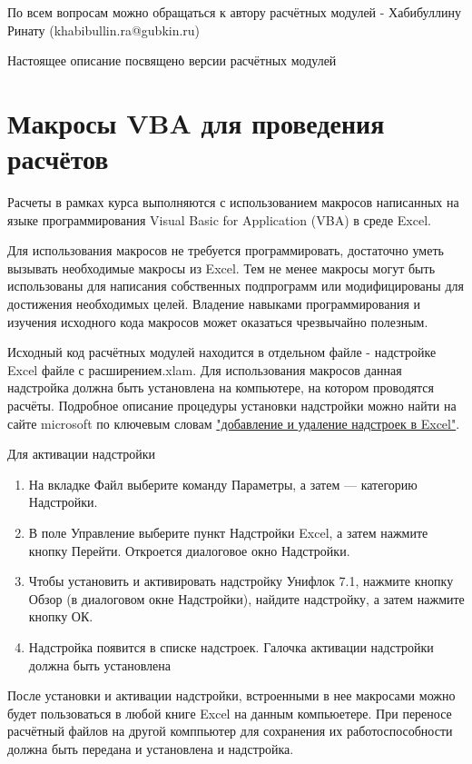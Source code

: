 \documentclass[]{scrreprt}
\begin{document}
По всем вопросам можно обращаться к автору расчётных модулей - Хабибуллину Ринату (khabibullin.ra@gubkin.ru)  

Настоящее описание посвящено версии \unf  расчётных модулей 

\chapter{Макросы VBA для проведения расчётов}

Расчеты в рамках курса выполняются с использованием макросов написанных на языке программирования Visual Basic for Application (VBA) в среде Excel.

Для использования макросов не требуется программировать, достаточно уметь вызывать необходимые макросы из Excel. Тем не менее макросы могут быть использованы для написания собственных подпрограмм или модифицированы для достижения необходимых целей. Владение навыками программирования и изучения исходного кода макросов может оказаться чрезвычайно полезным. 

Исходный код расчётных модулей находится в отдельном файле - надстройке Excel файле с расширением.xlam. Для использования макросов данная надстройка должна быть установлена на компьютере, на котором проводятся расчёты. Подробное описание процедуры установки надстройки можно найти на сайте microsoft по ключевым словам \href{https://support.office.com/ru-ru/article/%D0%94%D0%BE%D0%B1%D0%B0%D0%B2%D0%BB%D0%B5%D0%BD%D0%B8%D0%B5-%D0%B8-%D1%83%D0%B4%D0%B0%D0%BB%D0%B5%D0%BD%D0%B8%D0%B5-%D0%BD%D0%B0%D0%B4%D1%81%D1%82%D1%80%D0%BE%D0%B5%D0%BA-%D0%B2-excel-0af570c4-5cf3-4fa9-9b88-403625a0b460}{"добавление и удаление надстроек в Excel"}.

Для активации надстройки 
\begin{enumerate}
	\item На вкладке Файл выберите команду Параметры, а затем — категорию Надстройки.
	\item В поле Управление выберите пункт Надстройки Excel, а затем нажмите кнопку Перейти. Откроется диалоговое окно Надстройки.
	\item Чтобы установить и активировать надстройку Унифлок 7.1, нажмите кнопку Обзор (в диалоговом окне Надстройки), найдите надстройку, а затем нажмите кнопку ОК.
	\item Надстройка появится в списке надстроек. Галочка активации надстройки должна быть установлена
\end{enumerate}	
После установки и активации надстройки, встроенными в нее макросами можно будет пользоваться в любой книге Excel на данным компьюетере. При переносе расчётный файлов на другой комппьютер для сохранения их работоспособности должна быть передана и установлена и надстройка. 
\end{document}
